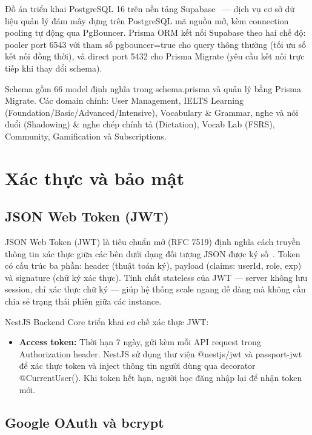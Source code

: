 Đồ án triển khai PostgreSQL 16 trên nền tảng Supabase~\cite{supabase-docs} --- dịch vụ cơ sở dữ liệu quản lý đám mây dựng trên PostgreSQL mã nguồn mở, kèm connection pooling tự động qua PgBouncer. Prisma ORM kết nối Supabase theo hai chế độ: pooler port 6543 với tham số pgbouncer=true cho query thông thường (tối ưu số kết nối đồng thời), và direct port 5432 cho Prisma Migrate (yêu cầu kết nối trực tiếp khi thay đổi schema).

Schema gồm 66 model định nghĩa trong schema.prisma và quản lý bằng Prisma Migrate. Các domain chính: User Management, IELTS Learning (Foundation\slash Basic\slash Advanced\slash Intensive), Vocabulary \& Grammar, nghe và nói đuổi (Shadowing) \& nghe chép chính tả (Dictation), Vocab Lab (FSRS), Community, Gamification và Subscriptions.

\section{Xác thực và bảo mật}

\subsection{JSON Web Token (JWT)}

JSON Web Token (JWT) là tiêu chuẩn mở (RFC 7519) định nghĩa cách truyền thông tin xác thực giữa các bên dưới dạng đối tượng JSON được ký số~\cite{jwt-rfc}. Token có cấu trúc ba phần: header (thuật toán ký), payload (claims: userId, role, exp) và signature (chữ ký xác thực). Tính chất stateless của JWT --- server không lưu session, chỉ xác thực chữ ký --- giúp hệ thống scale ngang dễ dàng mà không cần chia sẻ trạng thái phiên giữa các instance.

NestJS Backend Core triển khai cơ chế xác thực JWT:

\begin{itemize}
    \item \textbf{Access token:} Thời hạn 7 ngày, gửi kèm mỗi API request trong Authorization header. NestJS sử dụng thư viện @nestjs/jwt và passport-jwt để xác thực token và inject thông tin người dùng qua decorator @CurrentUser(). Khi token hết hạn, người học đăng nhập lại để nhận token mới.
\end{itemize}

\subsection{Google OAuth và bcrypt}

